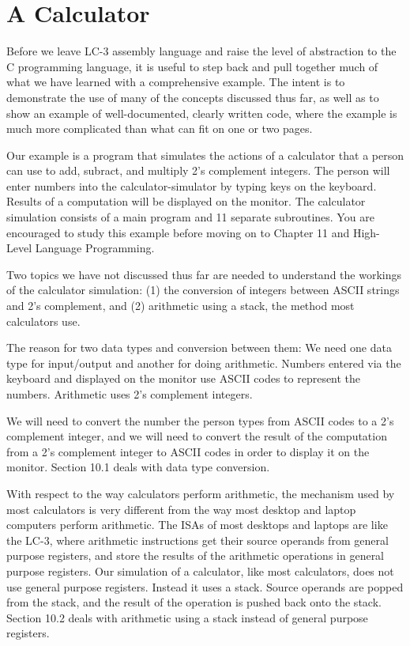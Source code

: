 \documentclass{patt}
\begin{document}
\setcounter{part}{1}
\setcounter{chapter}{9}
\setcounter{page}{251}

\chapter{A Calculator}
\label{chapt:calculator}

Before we leave LC-3 assembly language and raise the level of
abstraction to the C programming language, it is useful to step back 
and pull together much of what we have learned with a comprehensive example. 
The intent is to demonstrate the use of many of the concepts discussed 
thus far, as well as to show an example of well-documented, clearly written 
code, where the example is much more complicated than what can fit on one 
or two pages.  

Our example is a program that simulates the actions of a calculator that a 
person can use to add, subract, and multiply 2's complement integers.  
The person will enter numbers into the calculator-simulator by typing keys 
on the keyboard.  Results of a computation will be displayed on the monitor.  
The calculator simulation consists of a main program and 11 separate 
subroutines.  You are encouraged to study this example before moving on to 
Chapter 11 and High-Level Language Programming.

Two topics we have not discussed thus far are needed to understand the 
workings of the calculator simulation: (1) the conversion of integers between
ASCII strings and 2's complement, and (2) arithmetic using a stack, the
method most calculators use.

The reason for two data types and conversion between them: We need 
one data type for input/output and another for doing arithmetic.  Numbers
entered via the keyboard and displayed on the monitor use ASCII codes to
represent the numbers.  Arithmetic uses 2's complement integers.

We will need to convert the number the person 
types from ASCII codes to a 2's complement integer, and we will need to 
convert the result of the computation from a 2's complement integer to ASCII 
codes in order to display it on the monitor.  Section 10.1 deals with 
data type conversion.

With respect to the way calculators perform arithmetic, the mechanism used by
most calculators is very different from the way most desktop and laptop 
computers perform arithmetic.  The ISAs of most desktops and laptops are like
the LC-3, where arithmetic instructions get their source operands from general
purpose registers, and store the results of the arithmetic operations in 
general purpose registers.  Our simulation of a calculator, like most 
calculators, does not use general purpose registers.  Instead it uses a stack. 
Source operands are popped from the stack, and the result of the 
operation is pushed back onto the stack.  Section 10.2 deals with 
arithmetic using a stack instead of general purpose registers.
\end{document}
